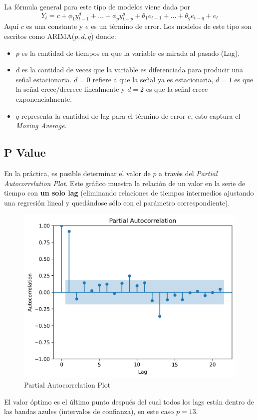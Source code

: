 La fórmula general para este tipo de modelos viene dada por 
$$
Y_t = c + \phi_1y^d_{t-1} + \dots + \phi_py^d_{t-p} + \theta_1e_{t-1} + \dots + \theta_q e_{t-q} + e_t
$$
Aquí $c$ es una constante y $e$ es un término de error. Los modelos de este tipo son escritos como ARIMA($p,d,q$) donde: 

\begin{itemize}
    \item $p$ es la cantidad de tiempos en que la variable es mirada al pasado (Lag).
    \item $d$ es la cantidad de veces que la variable es diferenciada para producir una señal estacionaria. $d=0$ refiere a que la señal ya es estacionaria, $d=1$ es que la señal crece/decrece linealmente y $d=2$ es que la señal crece exponencialmente. 
    \item $q$ representa la cantidad de lag para el término de error $e$, esto captura el \textit{Moving Average}.
\end{itemize}

\subsection{P Value}

En la práctica, es posible determinar el valor de $p$ a través del \textit{Partial Autocorrelation Plot}. Este gráfico muestra la relación de un valor en la serie de tiempo con \textbf{un solo lag} (eliminando relaciones de tiempos intermedios ajustando una regresión lineal y quedándose sólo con el parámetro correspondiente).
\begin{figure}[H]
    \center
    \includegraphics[scale=0.5]{notebooks/ML/img/partial_autocorrelation.png}
    \caption{Partial Autocorrelation Plot}
\end{figure}
El valor óptimo es el último punto después del cual todos los lags están dentro de las bandas azules (intervalos de confianza), en este caso $p=13$. 

